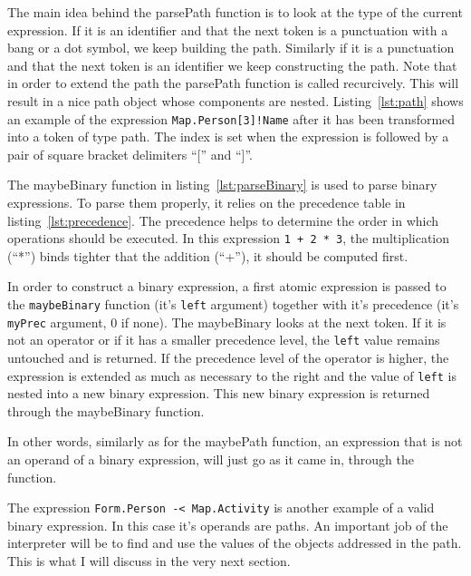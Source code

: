 The main idea behind the parsePath function is to look at the type of the current expression. If it is an identifier and that the next token is a punctuation with a bang or a dot symbol, we keep building the path. Similarly if it is a punctuation and that the next token is an identifier we keep constructing the path. Note that in order to extend the path the parsePath function is called recurcively. This will result in a nice path object whose components are nested. Listing~\ref{lst:path} shows an example of the expression \texttt{Map.Person[3]!Name} after it has been transformed into a token of type path. The index is set when the expression is followed by a pair of square bracket delimiters ``['' and ``]''.


The maybeBinary function in listing~\ref{lst:parseBinary} is used to parse binary expressions. To parse them properly, it relies on the precedence table in listing~\ref{lst:precedence}. The precedence helps to determine the order in which operations should be executed. In this expression \texttt{1 + 2 * 3}, the multiplication (``*'') binds tighter that the addition (``+''), it should be computed first.





In order to construct a binary expression, a first atomic expression is passed to the \texttt{maybeBinary} function (it's \texttt{left} argument) together with it's precedence (it's \texttt{myPrec} argument, 0 if none). The maybeBinary looks at the next token. If it is not an operator or if it has a smaller precedence level, the \texttt{left} value remains untouched and is returned. If the precedence level of the operator is higher, the expression is extended as much as necessary to the right and the value of \texttt{left} is nested into a new binary expression. This new binary expression is returned through the maybeBinary function.

In other words, similarly as for the maybePath function, an expression that is not an operand of a binary expression, will just go as it came in, through the function.

The expression \texttt{Form.Person -< Map.Activity} is another example of a valid binary expression. In this case it's operands are paths. An important job of the interpreter will be to find and use the values of the objects addressed in the path. This is what I will discuss in the very next section.

